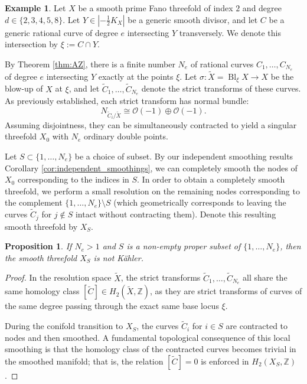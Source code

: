 \documentclass[11pt]{article}
\newtheorem{prop}[thm]{Proposition}
\theoremstyle{definition}
\newtheorem{ex}[thm]{Example}
\newcommand{\abs}[1]{\left\vert#1\right\vert}
\newcommand{\OO}{\mathcal{O}}
\newcommand{\Z}{\mathbb{Z}}
\DeclareMathOperator{\Bl}{Bl}
\begin{document}
\begin{ex}
Let $X$ be a smooth prime Fano threefold of index $2$ and degree $d \in \{2,3,4,5,8\}$. Let $Y \in \abs{-\frac{1}{2} K_X}$ be a generic smooth divisor, and let $C$ be a generic rational curve of degree $e$ intersecting $Y$ transversely. We denote this intersection by $\xi := C \cap Y$. 

By Theorem \ref{thm:AZ}, there is a finite number $N_e$ of rational curves $C_1, \dots, C_{N_e}$ of degree $e$ intersecting $Y$ exactly at the points $\xi$. Let $\sigma: \tilde{X} = \Bl_\xi X \to X$ be the blow-up of $X$ at $\xi$, and let $\tilde{C}_1, \dots, \tilde{C}_{N_e}$ denote the strict transforms of these curves. As previously established, each strict transform has normal bundle:
\[ N_{\tilde{C}_i/\tilde{X}} \cong \OO(-1) \oplus \OO(-1). \]
Assuming disjointness, they can be simultaneously contracted to yield a singular threefold $X_0$ with $N_e$ ordinary double points. 

Let $S \subset \{1, \dots, N_e\}$ be a choice of subset. By our independent smoothing results Corollary \ref{cor:independent_smoothings}, we can completely smooth the nodes of $X_0$ corresponding to the indices in $S$. In order to obtain a completely smooth threefold, we perform a small resolution on the remaining nodes corresponding to the complement $\{1, \dots, N_e\} \setminus S$ (which geometrically corresponds to leaving the curves $\tilde{C}_j$ for $j \notin S$ intact without contracting them). Denote this resulting smooth threefold by $X_S$.

\begin{prop}
If $N_e > 1$ and $S$ is a non-empty proper subset of $\{1, \dots, N_e\}$, then the smooth threefold $X_S$ is not Kähler. 
\end{prop}

\begin{proof}
In the resolution space $\tilde{X}$, the strict transforms $\tilde{C}_1, \dots, \tilde{C}_{N_e}$ all share the same homology class $[\tilde{C}] \in H_2(\tilde{X}, \Z)$, as they are strict transforms of curves of the same degree passing through the exact same base locus $\xi$. 

During the conifold transition to $X_S$, the curves $\tilde{C}_i$ for $i \in S$ are contracted to nodes and then smoothed. A fundamental topological consequence of this local smoothing is that the homology class of the contracted curves becomes trivial in the smoothed manifold; that is, the relation $[\tilde{C}] = 0$ is enforced in $H_2(X_S, \Z)$.


\end{proof}
\end{ex}
\end{document}
